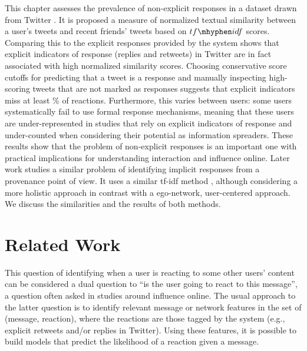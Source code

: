 This chapter assesses the prevalence of non-explicit responses in a dataset drawn from Twitter \cite{BarbosaNeto2013, Barbosa}. It is proposed a measure of normalized textual similarity between a user's tweets and recent friends' tweets based on $tf\mhyphen idf$ scores.  Comparing this to the explicit responses provided by the system shows that explicit indicators of response (replies and retweets) in Twitter are in fact associated with high normalized similarity scores.  Choosing conservative score cutoffs for predicting that a tweet is a response and manually inspecting high-scoring tweets that are not marked as responses suggests that explicit indicators miss at least \highNonTaggedTweetCountPct{}\% of reactions. 
Furthermore, this varies between users: some users systematically fail to use formal response mechanisms, meaning that these users are under-represented in studies that rely on explicit indicators of response and under-counted when considering their potential as information spreaders. These results show that the problem of non-explicit responses is an important one with practical implications for understanding interaction and influence online. 
Later work \cite{taxidou2016} studies a similar problem of identifying implicit responses from a provenance point of view. It uses a similar tf-idf method \cite{de2015}, although considering a more holistic approach in contrast with a ego-network, user-centered approach. We discuss the similarities and the results of both methods.


\section{Related Work}

This question of identifying when a user is reacting to some other users' content can be considered a dual 
question to ``is the user going to react to this message'', a question often asked in studies around influence online. 
The usual approach to the latter question is to identify relevant message or network features in the set of (message, reaction), where the reactions are those tagged by the system (e.g., explicit retweets and/or replies in Twitter).  
Using these features, it is possible to build models that predict the likelihood of a reaction given a message.

